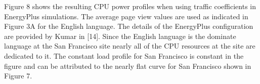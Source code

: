     Figure 8 shows the resulting CPU power profiles when using traffic coefficients in EnergyPlus simulations. The average page view values are used as indicated in Figure 3A for the English language. The details of the EnergyPlus configuration are provided by Kumar in [14]. Since the English language is the dominate language at the San Francisco site nearly all of the CPU resources at the site are dedicated to it. The constant load profile for San Francisco is constant in the figure and can be attributed to the nearly flat curve for San Francisco shown in Figure 7. 
    
    